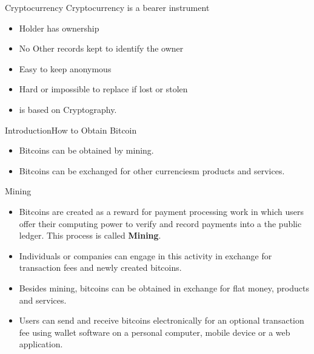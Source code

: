 \documentclass[handout]{beamer}
\begin{document}
\begin{frame}{Cryptocurrency}{}
Cryptocurrency is a bearer instrument
  \begin{itemize}       
\item Holder has ownership

 \item No Other records kept to identify the owner

 \item Easy to keep anonymous
 
 \item Hard or impossible to replace if lost or stolen
 
 \item is based on Cryptography.
    
  \end{itemize}
\end{frame}





\begin{frame}{Introduction}{How to Obtain Bitcoin}

  \begin{itemize}       
\item Bitcoins can be obtained by mining.

 \item Bitcoins can be exchanged for other currenciesm products and services.
    
  \end{itemize}
\end{frame}


\begin{frame}{Mining}{}

  \begin{itemize}       
\item<1-> Bitcoins are created as a reward for payment processing work in which users offer their computing power to verify and record payments into a the public ledger. This process is called \textbf{Mining}.

 \item<2-> Individuals or companies can engage in this activity in exchange for transaction fees and newly created bitcoins.

 \item<3-> Besides mining,  bitcoins can be obtained in exchange for flat money, products and services.

 \item<4-> Users can send and receive bitcoins electronically for an optional transaction fee using wallet software on a personal computer, mobile device or a web application.
    
  \end{itemize}
\end{frame}
\end{document}
